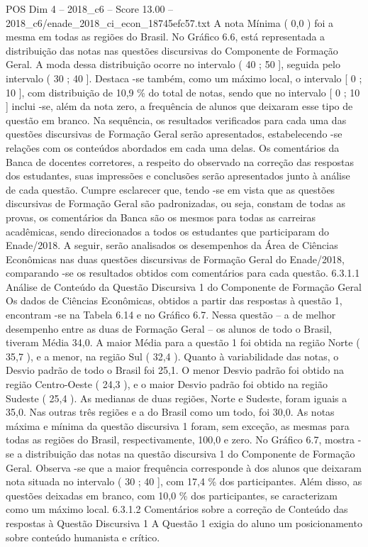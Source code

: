 \begin{textsample}{POS Dim 4 – 2018\_c6 – Score 13.00 – 2018\_c6/enade\_2018\_ci\_econ\_18745efc57.txt}
A nota Mínima ( 0,0 ) foi a mesma em todas as regiões do Brasil.
No Gráfico 6.6, está representada a distribuição das notas nas questões discursivas do Componente de Formação Geral.
A moda dessa distribuição ocorre no intervalo ( 40 ; 50 ], seguida pelo intervalo ( 30 ; 40 ].
Destaca -se também, como um máximo local, o intervalo [ 0 ; 10 ], com distribuição de 10,9 \% do total de notas, sendo que no intervalo [ 0 ; 10 ] inclui -se, além da nota zero, a frequência de alunos que deixaram esse tipo de questão em branco.
Na sequência, os resultados verificados para cada uma das questões discursivas de Formação Geral serão apresentados, estabelecendo -se relações com os conteúdos abordados em cada uma delas.
Os comentários da Banca de docentes corretores, a respeito do observado na correção das respostas dos estudantes, suas impressões e conclusões serão apresentados junto à análise de cada questão.
Cumpre esclarecer que, tendo -se em vista que as questões discursivas de Formação Geral são padronizadas, ou seja, constam de todas as provas, os comentários da Banca são os mesmos para todas as carreiras acadêmicas, sendo direcionados a todos os estudantes que participaram do Enade/2018.
A seguir, serão analisados os desempenhos da Área de Ciências Econômicas nas duas questões discursivas de Formação Geral do Enade/2018, comparando -se os resultados obtidos com comentários para cada questão. 6.3.1.1 Análise de Conteúdo da Questão Discursiva 1 do Componente de Formação Geral Os dados de Ciências Econômicas, obtidos a partir das respostas à questão 1, encontram -se na Tabela 6.14 e no Gráfico 6.7.
Nessa questão – a de melhor desempenho entre as duas de Formação Geral – os alunos de todo o Brasil, tiveram Média 34,0.
A maior Média para a questão 1 foi obtida na região Norte ( 35,7 ), e a menor, na região Sul ( 32,4 ).
Quanto à variabilidade das notas, o Desvio padrão de todo o Brasil foi 25,1.
O menor Desvio padrão foi obtido na região Centro-Oeste ( 24,3 ), e o maior Desvio padrão foi obtido na região Sudeste ( 25,4 ).
As medianas de duas regiões, Norte e Sudeste, foram iguais a 35,0.
Nas outras três regiões e a do Brasil como um todo, foi 30,0.
As notas máxima e mínima da questão discursiva 1 foram, sem exceção, as mesmas para todas as regiões do Brasil, respectivamente, 100,0 e zero.
No Gráfico 6.7, mostra -se a distribuição das notas na questão discursiva 1 do Componente de Formação Geral.
Observa -se que a maior frequência corresponde à dos alunos que deixaram nota situada no intervalo ( 30 ; 40 ], com 17,4 \% dos participantes.
Além disso, as questões deixadas em branco, com 10,0 \% dos participantes, se caracterizam como um máximo local. 6.3.1.2 Comentários sobre a correção de Conteúdo das respostas à Questão Discursiva 1 A Questão 1 exigia do aluno um posicionamento sobre conteúdo humanista e crítico.

\end{textsample}
